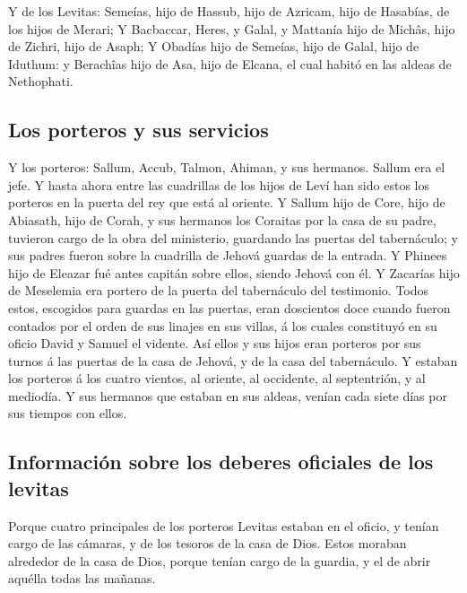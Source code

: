  Y de los Levitas: Semeías, hijo de Hassub, hijo de
Azricam, hijo de Hasabías, de los hijos de Merari;  Y
Bacbaccar, Heres, y Galal, y Mattanía hijo de Michâs, hijo de Zichri,
hijo de Asaph;  Y Obadías hijo de Semeías, hijo de Galal,
hijo de Iduthum: y Berachîas hijo de Asa, hijo de Elcana, el cual habitó
en las aldeas de Nethophati.

\hypertarget{los-porteros-y-sus-servicios}{%
\subsection{Los porteros y sus
servicios}\label{los-porteros-y-sus-servicios}}

 Y los porteros: Sallum, Accub, Talmon, Ahiman, y sus
hermanos. Sallum era el jefe.  Y hasta ahora entre las
cuadrillas de los hijos de Leví han sido estos los porteros en la puerta
del rey que está al oriente.  Y Sallum hijo de Core, hijo
de Abiasath, hijo de Corah, y sus hermanos los Coraitas por la casa de
su padre, tuvieron cargo de la obra del ministerio, guardando las
puertas del tabernáculo; y sus padres fueron sobre la cuadrilla de
Jehová guardas de la entrada.  Y Phinees hijo de Eleazar
fué antes capitán sobre ellos, siendo Jehová con él.  Y
Zacarías hijo de Meselemia era portero de la puerta del tabernáculo del
testimonio.  Todos estos, escogidos para guardas en las
puertas, eran doscientos doce cuando fueron contados por el orden de sus
linajes en sus villas, á los cuales constituyó en su oficio David y
Samuel el vidente.  Así ellos y sus hijos eran porteros
por sus turnos á las puertas de la casa de Jehová, y de la casa del
tabernáculo.  Y estaban los porteros á los cuatro
vientos, al oriente, al occidente, al septentrión, y al mediodía.
 Y sus hermanos que estaban en sus aldeas, venían cada
siete días por sus tiempos con ellos.

\hypertarget{informaciuxf3n-sobre-los-deberes-oficiales-de-los-levitas}{%
\subsection{Información sobre los deberes oficiales de los
levitas}\label{informaciuxf3n-sobre-los-deberes-oficiales-de-los-levitas}}

 Porque cuatro principales de los porteros Levitas
estaban en el oficio, y tenían cargo de las cámaras, y de los tesoros de
la casa de Dios.  Estos moraban alrededor de la casa de
Dios, porque tenían cargo de la guardia, y el de abrir aquélla todas las
mañanas.

